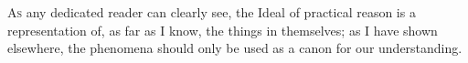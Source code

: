 \documentclass{article}
\begin{document}
  \lettrine{A}{s} any dedicated reader can clearly see, the Ideal of practical reason is a representation of, as far as I know, the things in themselves; as I have shown elsewhere, the phenomena should only be used as a canon for our understanding.
\end{document}
